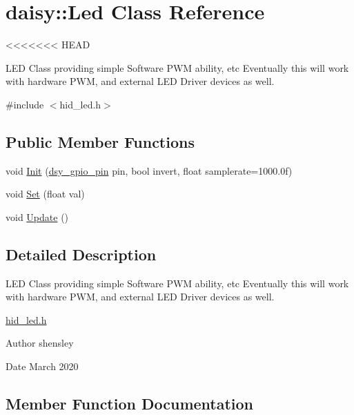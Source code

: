 \hypertarget{classdaisy_1_1_led}{}\section{daisy\+:\+:Led Class Reference}
\label{classdaisy_1_1_led}
<<<<<<< HEAD


L\+ED Class providing simple Software P\+WM ability, etc Eventually this will work with hardware P\+WM, and external L\+ED Driver devices as well.  




{\ttfamily \#include $<$hid\+\_\+led.\+h$>$}

\subsection*{Public Member Functions}
\begin{DoxyCompactItemize}
\item 
void \hyperlink{classdaisy_1_1_led_a0af3ce433660d9f21e94368d5d84fe6e}{Init} (\hyperlink{structdsy__gpio__pin}{dsy\+\_\+gpio\+\_\+pin} pin, bool invert, float samplerate=1000.\+0f)
\item 
void \hyperlink{classdaisy_1_1_led_a7394c869bc8b34d94c183c2b7fb16bc7}{Set} (float val)
\item 
void \hyperlink{classdaisy_1_1_led_aeec57ceddd9f685c50446321ba6e1492}{Update} ()
\end{DoxyCompactItemize}


\subsection{Detailed Description}
L\+ED Class providing simple Software P\+WM ability, etc Eventually this will work with hardware P\+WM, and external L\+ED Driver devices as well. 

\hyperlink{hid__led_8h_source}{hid\+\_\+led.\+h} \begin{DoxyAuthor}{Author}
shensley 
\end{DoxyAuthor}
\begin{DoxyDate}{Date}
March 2020 
\end{DoxyDate}


\subsection{Member Function Documentation}
\mbox{\label{classdaisy_1_1_led_a0af3ce433660d9f21e94368d5d84fe6e}} 
